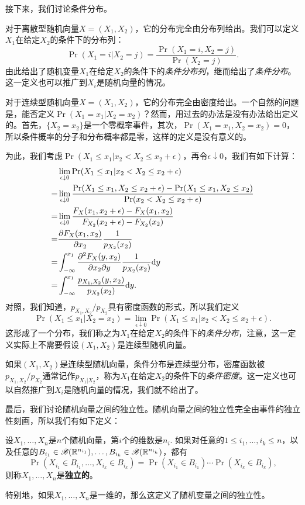 接下来，我们讨论条件分布。

对于离散型随机向量$X=(X_1,X_2)$，它的分布完全由分布列给出。我们可以定义$X_1$在给定$X_2$的条件下的分布列：
\[\Pr(X_1=i|X_2=j)=\frac{\Pr(X_1=i,X_2=j)}{\Pr(X_2=j)}.\]
由此给出了随机变量$X_1$在给定$X_2$的条件下的\emph{条件分布列}，继而给出了\emph{条件分布}。这一定义也可以推广到$X_i$是随机向量的情况。

对于连续型随机向量$X=(X_1,X_2)$，它的分布完全由密度给出。一个自然的问题是，能否定义$\Pr(X_1=x_1|X_2=x_2)$？然而，用过去的办法是没有办法给出定义的。首先，$\{X_2=x_2\}$是一个零概率事件，其次，$\Pr(X_1=x_1,X_2=x_2)=0$，所以条件概率的分子和分布概率都是零，这样的定义是没有意义的。

为此，我们考虑$\Pr(X_1\leq x_1|x_2< X_2\leq x_2+\epsilon)$，再令$\epsilon\downarrow 0$，我们有如下计算：
\begin{align*}
    &\lim_{\epsilon\downarrow 0}\Pr(X_1\leq x_1|x_2< X_2\leq x_2+\epsilon) \\
    =&\lim_{\epsilon\downarrow 0}\frac{\Pr(X_1\leq x_1,X_2\leq x_2+\epsilon)-\Pr(X_1\leq x_1,X_2\leq x_2)}{\Pr(x_2< X_2\leq x_2+\epsilon)}\\
    =&\lim_{\epsilon\downarrow 0}\frac{F_X(x_1,x_2+\epsilon)-F_X(x_1,x_2)}{F_{X_2}(x_2+\epsilon)-F_{X_2}(x_2)}\\
    =&\frac{\partial F_X(x_1,x_2)}{\partial x_2}\frac{1}{p_{X_2}(x_2)}\\
    =&\int_{-\infty}^{x_1}\frac{\partial^2 F_X(y,x_2)}{\partial x_2\partial y}\frac{1}{p_{X_2}(x_2)}\mathrm{d} y\\
    =&\int_{-\infty}^{x_1}\frac{p_{X_1,X_2}(y,x_2)}{p_{X_2}(x_2)}\mathrm{d} y.
\end{align*}
对照，我们知道，$p_{X_1,X_2}/p_{X_2}$具有密度函数的形式，所以我们定义
\[\Pr(X_1\leq x_1|X_2=x_2)=\lim_{\epsilon\downarrow 0}\Pr(X_1\leq x_1|x_2< X_2\leq x_2+\epsilon).\]
这形成了一个分布，我们称之为$X_1$在给定$X_2$的条件下的\emph{条件分布}，注意，这一定义实际上不需要假设$(X_1,X_2)$是连续型随机向量。

如果$(X_1,X_2)$是连续型随机向量，条件分布是连续型分布，密度函数被$p_{X_1,X_2}/p_{X_2}$通常记作$p_{X_1|X_2}$，称为$X_1$在给定$X_2$的条件下的\emph{条件密度}。这一定义也可以自然推广到$X_i$是随机向量的情况，我们就不给出了。

最后，我们讨论随机向量之间的独立性。随机向量之间的独立性完全由事件的独立性刻画，所以我们有如下定义：

\begin{definition}[随机向量的独立性]
设$X_1,\dots,X_n$是$n$个随机向量，第$i$个的维数是$n_i$. 如果对任意的$1\leq i_1,\dots,i_k\leq n$，以及任意的$B_{i_1}\in\mathscr{B}(\mathbb{R}^{n_{i_1}}),\dots,B_{i_k}\in\mathscr{B}(\mathbb{R}^{n_{i_k}})$，都有
\[\Pr(X_{i_1}\in B_{i_1},\dots,X_{i_k}\in B_{i_k})=\Pr(X_{i_1}\in B_{i_1})\cdots\Pr(X_{i_k}\in B_{i_k}),\]
则称$X_1,\dots,X_n$是\textbf{独立的}。

特别地，如果$X_1,\dots,X_n$是一维的，那么这定义了随机变量之间的独立性。
\end{definition}

